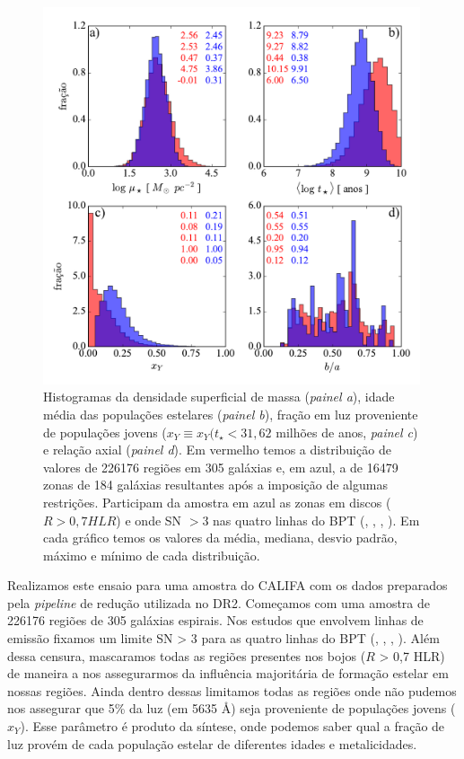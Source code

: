 \begin{figure}
	\centering
	\includegraphics[width=0.99\textwidth]{figuras/histosample.pdf}
	\caption[Histogramas: densidade superficial de massa, idade média, fração de populações jovens e
	relação axial.]
	{Histogramas da densidade superficial de massa ({\em painel a}), idade média das populações estelares ({\em painel b}), fração em luz proveniente de populações jovens ($x_Y \equiv x_Y(t_\star < 31,62$ milhões de anos, {\em painel c}) e relação axial ({\em painel d}). Em vermelho temos a distribuição de valores de 226176 regiões em 305 galáxias e, em azul, a de 16479 zonas de 184 galáxias resultantes após a imposição de algumas restrições. Participam da amostra em azul as zonas em discos ($R > 0,7 HLR$) e onde SN $>3$ nas quatro linhas do BPT (\Hb, \oiii, \Ha, \nii). Em cada gráfico temos os valores da média, mediana, desvio padrão, máximo e mínimo de cada distribuição.}
	\label{fig:histosample}
\end{figure}

Realizamos este ensaio para uma amostra do CALIFA com os dados preparados pela {\em pipeline} de redução utilizada no DR2. Começamos com uma amostra de 226176 regiões de 305 galáxias espirais. Nos estudos que envolvem linhas de emissão fixamos um limite SN > 3 para as quatro linhas do BPT (\Hb, \oiii, \Ha, \nii).
Além dessa censura, mascaramos todas as regiões presentes nos bojos ($R$ > 0,7 HLR) de maneira a nos assegurarmos da influência majoritária de formação estelar em nossas regiões. Ainda dentro dessas limitamos todas as regiões onde não pudemos nos assegurar que 5\% da luz (em 5635 \AA) seja proveniente de populações jovens ($x_Y$). Esse parâmetro é produto da síntese, onde podemos saber qual a fração de luz provém de cada população estelar de diferentes idades e metalicidades.

